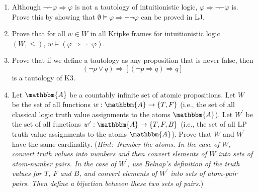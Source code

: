 \documentclass[11pt]{article}
\theoremstyle{definition}
\theoremstyle{remark}
\begin{document}
\begin{enumerate}
    \item Although $\neg\neg\varphi\Rightarrow\varphi$ is not a tautology of intuitionistic logic, $\varphi\Rightarrow\neg\neg\varphi$ is. Prove this by showing that $\emptyset\vDash\varphi\Rightarrow\neg\neg\varphi$ can be proved in LJ.

    \item Prove that for all $w\in W$ in all Kripke frames for intuitionistic logic $(W,\leq)$, $w\vDash(\varphi\Rightarrow\neg\neg\varphi)$.

    \item Prove that if we define a tautology as any proposition that is never false, then $$(\neg p \vee q)\Rightarrow [(\neg p\Rightarrow q)\Rightarrow q]$$ is a tautology of K3. 

    \item Let $\mathbbm{A}$ be a countably infinite set of atomic propositions. Let $W$ be the set of all functions $w:\mathbbm{A}\rightarrow\{T,F\}$ (i.e., the set of all classical logic truth value assignments to the atoms $\mathbbm{A}$). Let $W^{\prime}$ be the set of all functions $w^{\prime}:\mathbbm{A}\rightarrow\{T,F,B\}$ (i.e., the set of all LP truth value assignments to the atoms $\mathbbm{A}$). Prove that $W$ and $W^{\prime}$ have the same cardinality. (\textit{Hint:\ Number the atoms. In the case of $W$, convert truth values into numbers and then convert elements of $W$ into sets of atom-number pairs. In the case of $W^{\prime}$, use Belnap's definition of the truth values for $T$, $F$ and $B$, and convert elements of $W^{\prime}$ into sets of atom-pair pairs. Then define a bijection between these two sets of pairs.})
\end{enumerate}
\end{document}
